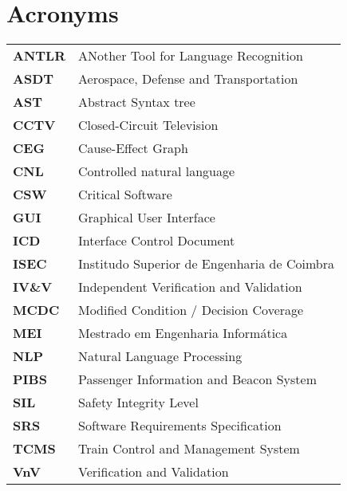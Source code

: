 \chapter*{Acronyms}

    \setlength{\LTleft}{0pt}
    \begin{longtable}{l l}
    \textbf{ANTLR}      &   ANother Tool for Language Recognition\\
    \textbf{ASDT}       &   Aerospace, Defense and Transportation\\
    \textbf{AST}        &   Abstract Syntax tree\\
    \textbf{CCTV}       &   Closed-Circuit Television\\
    \textbf{CEG}        &   Cause-Effect Graph\\
    \textbf{CNL}        &   Controlled natural language\\
    \textbf{CSW}        &   Critical Software\\
    \textbf{GUI}        &   Graphical User Interface\\
    \textbf{ICD}        &   Interface Control Document\\
    \textbf{ISEC}       &   Institudo Superior de Engenharia de Coimbra\\
    \textbf{IV\&V}      &   Independent Verification and Validation\\
    \textbf{MCDC}       &   Modified Condition / Decision Coverage\\
    \textbf{MEI}        &   Mestrado em Engenharia Informática \\
    \textbf{NLP}        &   Natural Language Processing \\
    \textbf{PIBS}       &   Passenger Information and Beacon System \\
    \textbf{SIL}        &   Safety Integrity Level \\
    \textbf{SRS}        &   Software Requirements Specification \\
    \textbf{TCMS}       &   Train Control and Management System \\
    \textbf{VnV}        &   Verification and Validation \\
    \end{longtable}
    \label{tab:my_label}
